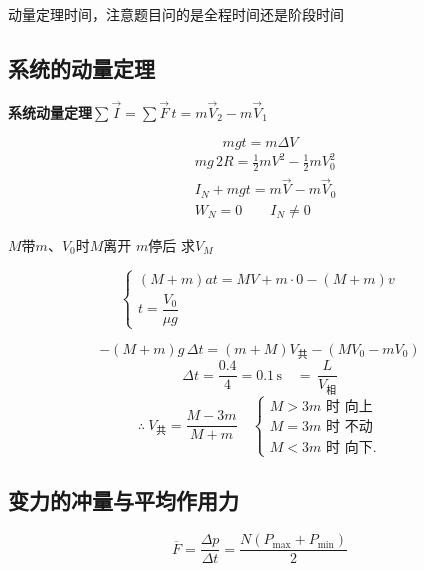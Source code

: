 动量定理时间，注意题目问的是全程时间还是阶段时间 %

\subsection{系统的动量定理}
\textbf{系统动量定理}\quad $\sum\vec I=\sum\vec F\,t=m\vec V_2-m\vec V_1$

\[
mgt=m\Delta V
\]
\begin{align*}
&mg\,2R=\tfrac12 mV^2-\tfrac12 mV_0^2\\
&I_N+mgt=m\vec V-m\vec V_0\\
&W_N=0\qquad I_N\ne0
\end{align*}

\begin{problem}
$M$带$m$、$V_0$时$M$离开 $m$停后 求$V_M$
\begin{solution}
\[
\begin{cases}
(M+m)at=MV+m\cdot0-(M+m)v\\[2pt]
t=\dfrac{V_0}{\mu g}
\end{cases}
\]
\end{solution}
\end{problem}

\begin{problem}
\begin{solution}
\[
-(M+m)g\,\Delta t=(m+M)V_{\text{共}}-(MV_0-mV_0)
\]
\[
\Delta t=\dfrac{0.4}{4}=0.1\,\mathrm{s}\quad {=}\,\dfrac{L}{V_{\text{相}}}
\]
\[
\therefore\ V_{\text{共}}=\dfrac{M-3m}{M+m}\quad
\begin{cases}
M>3m\text{ 时 向上}\\
M=3m\text{ 时 不动}\\
M<3m\text{ 时 向下.}
\end{cases}
\]
\end{solution}
\end{problem}

\subsection{变力的冲量与平均作用力}
\[ \overline{F}=\frac{\Delta p}{\Delta t}=\frac{N(P_{\max}+P_{\min})}{2} \] %

